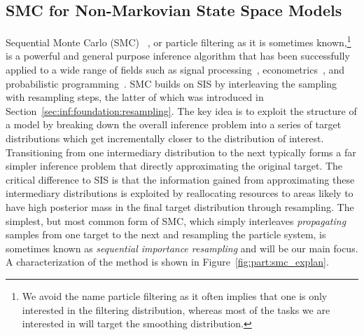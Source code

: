 \subsection{SMC for Non-Markovian State Space Models}
\label{sec:part:smc:smc-nmssm}

Sequential Monte Carlo (SMC)~\citep{gordon1993novel,doucet2001sequential,doucet2009tutorial} , or particle filtering 
as it is sometimes known,\footnote{We avoid the name
	particle filtering as it often implies that one is only interested in the filtering distribution, whereas
	most of the tasks we are interested in will target the smoothing distribution.} 
is a powerful and general purpose inference algorithm that has been successfully
applied to a wide range of fields such as signal processing~\citep{candy2016bayesian}, econometrics~\citep{creal2012survey}, 
and probabilistic programming~\citep{wood2014new}.  SMC builds on SIS by interleaving the sampling
with resampling steps, the latter
of which was introduced in Section~\ref{sec:inf:foundation:resampling}.
The key idea is to exploit the structure of a model by breaking down the overall 
inference problem into a series of target distributions which get incrementally closer to the 
distribution of interest.  Transitioning from one intermediary distribution to the next typically
forms a far simpler inference problem that directly approximating the original target.  The critical difference
to SIS is that
the information gained from approximating these intermediary distributions is exploited by
reallocating resources to areas likely to have high posterior mass in the final target distribution
through resampling.  The simplest, but most common form of SMC, which simply interleaves
\emph{propagating} samples from one target to the next and resampling the particle system, is sometimes known
as \emph{sequential importance resampling} and will be our main focus.
A characterization of the method is shown in Figure~\ref{fig:part:smc_explan}.  

